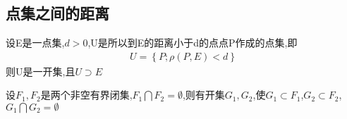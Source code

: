 \subsection{点集之间的距离}
\begin{Theorem}
    设E是一点集,\(d>0\),U是所以到E的距离小于d的点点P作成的点集,即\begin{align*}
        U = \left\{P ; \rho(P,E) < d\right\}
    \end{align*}
    则U是一开集,且\(U \supset E\)
\end{Theorem}
\begin{Theorem}[隔离性定理]
    设\(F_1,F_2\)是两个非空有界闭集,\(F_1 \bigcap F_2 = \emptyset\),则有开集\(G_1,G_2\),使\(G_1 \subset F_1\),\(G_2 \subset F_2\),\(G_1 \bigcap G_2 = \emptyset\)
\end{Theorem}

